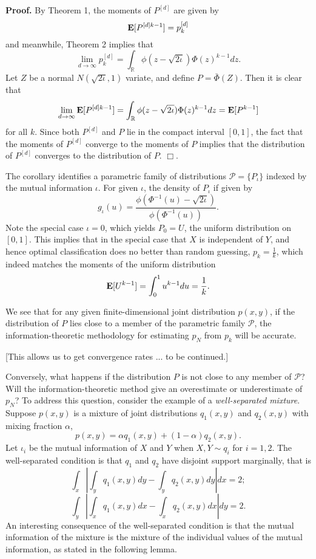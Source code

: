 \documentclass[12pt]{article}
\begin{document}
\noindent\textbf{Proof.} By Theorem 1, the moments of $P^{[d]}$ are given by
\[
\textbf{E}[P^{[d]k-1}] = p_k^{[d]}
\]
and meanwhile, Theorem 2 implies that
\[
\lim_{d \to \infty} p_k^{[d]} = \int_{\mathbb{R}} \phi(z - \sqrt{2\iota}) \Phi(z)^{k-1} dz.
\]
Let $Z$ be a normal $N(\sqrt{2\iota}, 1)$ variate,
and define $P = \bar{\Phi}(Z)$.
Then it is clear that
\[
\lim_{d \to \infty} \textbf{E}[P^{[d]k-1}] = \int_{\mathbb{R}} \phi(z - \sqrt{2\iota}) \Phi(z)^{k-1} dz = \textbf{E}[P^{k-1}]
\]
for all $k$.
Since both $P^{[d]}$ and $P$ lie in the compact interval $[0, 1]$,
the fact that the moments of $P^{[d]}$ converge to the moments of $P$ implies that the distribution of $P^[d]$
converges to the distribution of $P$. $\Box$.

The corollary identifies a parametric family of distributions $\mathcal{P} = \{P_\iota\}$ indexed by
the mutual information $\iota$.
For given $\iota$, the density of $P_\iota$ if given by
\[
g_\iota(u) = \frac{\phi(\Phi^{-1}(u) - \sqrt{2\iota})}{\phi(\Phi^{-1}(u))}.
\]
Note the special case $\iota = 0$, which yields $P_0 = U$, the uniform distribution on $[0,1]$.
This implies that in the special case that $X$ is independent of $Y$,
and hence optimal classification does no better than random guessing, $p_k = \frac{1}{k}$,
which indeed matches the moments of the uniform distribution
\[
\textbf{E}[U^{k-1}] = \int_0^1 u^{k-1} du = \frac{1}{k}.
\]

We see that for any given finite-dimensional joint distribution $p(x, y)$, if the distribution of $P$ lies close
to a member of the parametric family $\mathcal{P}$, the information-theoretic methodology for estimating
$p_N$ from $p_k$ will be accurate.

[This allows us to get convergence rates ... to be continued.]

Conversely, what happens if the distribution $P$ is not close to any member of $\mathcal{P}$?
Will the information-theoretic method give an overestimate or underestimate of $p_N$?
To address this question, consider the example of a \emph{well-separated mixture}.
Suppose $p(x,y)$ is a mixture of joint distributions $q_1(x,y)$ and $q_2(x,y)$ with mixing fraction $\alpha$,
\[
p(x, y) = \alpha q_1(x, y) + (1-\alpha) q_2(x, y).
\]
Let $\iota_i$ be the mutual information of $X$ and $Y$ when $X, Y \sim q_i$
for $i = 1,2$.
The well-separated condition is that $q_1$ and $q_2$ have disjoint support marginally, that is
\[
\int_x \left| \int_y q_1(x, y) dy - \int_y q_2(x, y) dy\right| dx = 2;
\]
\[
\int_y \left| \int_x q_1(x, y) dx - \int_x q_2(x, y) dx\right| dy = 2.
\]
An interesting consequence of the well-separated condition is that the mutual information of the mixture is the mixture of the individual values of the  mutual information, as stated in the following lemma.
\end{document}
